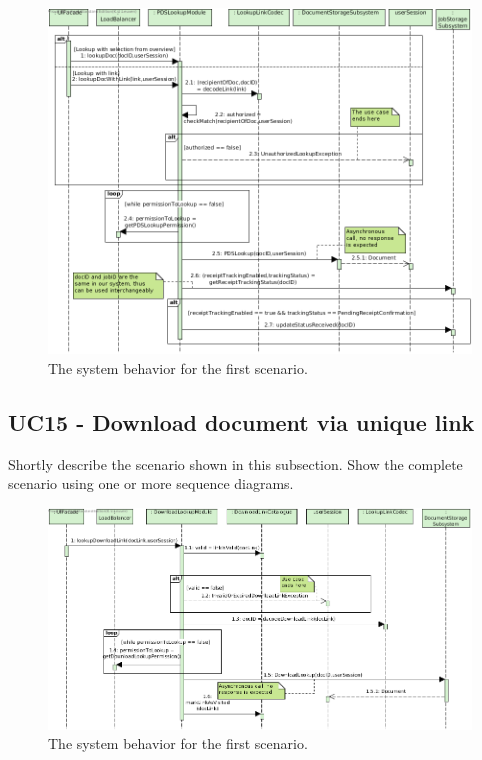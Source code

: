 \begin{figure}[!htp]
    \centering
    \includegraphics[width=\textwidth]{figures/UC14 - Consult document in PDS.png}
    \caption{The system behavior for the first scenario.
        }\label{fig:seq_uc14}
\end{figure}

\subsection{UC15 - Download document via unique link}
Shortly describe the scenario shown in this subsection.
Show the complete scenario using one or more sequence diagrams.

\begin{figure}[!htp]
    \centering
    \includegraphics[width=\textwidth]{figures/UC15 - Download document via unique link.png}
    \caption{The system behavior for the first scenario.
        }\label{fig:seq_uc15}
\end{figure}


